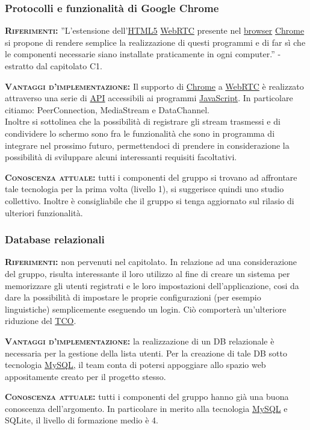 \subsubsection{Protocolli e funzionalità di Google Chrome}
\begin{description}
	\item{\scshape\bfseries Riferimenti:}
  ''L'estensione dell'\underline{HTML5} \underline{WebRTC} presente nel \underline{browser} \underline{Chrome} si propone di rendere semplice la realizzazione di questi programmi e di far sì che le componenti necessarie siano installate praticamente in ogni computer.'' - estratto dal capitolato C1.
  
 	\item{\scshape\bfseries Vantaggi d'implementazione:} Il supporto di \underline{Chrome} a \underline{WebRTC} è realizzato attraverso una serie di \underline{API} accessibili ai programmi \underline{JavaScript}. In particolare citiamo: PeerConnection, MediaStream e DataChannel.\\Inoltre si sottolinea che la possibilità di registrare gli stream trasmessi e di condividere lo schermo sono fra le funzionalità che sono in programma di integrare nel prossimo futuro, permettendoci di prendere in considerazione la possibilità di sviluppare alcuni interessanti requisiti facoltativi.
	
	\item{\scshape\bfseries Conoscenza attuale:} tutti i componenti del gruppo si trovano ad affrontare tale tecnologia per la prima volta (livello 1), si suggerisce quindi uno studio collettivo. Inoltre è consigliabile che il gruppo si tenga aggiornato sul rilasio di ulteriori funzionalità.
\end{description}

\subsubsection{Database relazionali}
\begin{description}
	\item{\scshape\bfseries Riferimenti:} non pervenuti nel capitolato. In relazione ad una considerazione del gruppo, risulta interessante il loro utilizzo al fine di creare un sistema per memorizzare gli utenti registrati e le loro impostazioni dell'applicazione, cosi da dare la possibilità di impostare le proprie configurazioni (per esempio linguistiche) semplicemente eseguendo un login. Ciò comporterà un'ulteriore riduzione del \underline{TCO}.
  
 	\item{\scshape\bfseries Vantaggi d'implementazione:} la realizzazione di un DB relazionale è necessaria per la gestione della lista utenti. Per la creazione di tale DB sotto tecnologia \underline{MySQL}, il team conta di potersi appoggiare allo spazio web appositamente creato per il progetto stesso.
	
	\item{\scshape\bfseries Conoscenza attuale:} tutti i componenti del gruppo hanno già una buona conoscenza dell'argomento. In particolare in merito alla tecnologia \underline{MySQL} e SQLite, il livello di formazione medio è 4.
\end{description}

